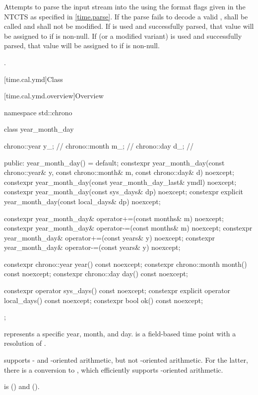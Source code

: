\begin{itemdescr}
\pnum
\effects
Attempts to parse the input stream 
into the   using
the format flags given in the NTCTS 
as specified in \ref{time.parse}.
If the parse fails to decode a valid ,
 shall be called
and  shall not be modified.
If  is used and successfully parsed,
that value will be assigned to  if  is non-null.
If  (or a modified variant) is used and successfully parsed,
that value will be assigned to  if  is non-null.

\pnum
\returns
{}.
\end{itemdescr}

[time.cal.ymd]{Class }

[time.cal.ymd.overview]{Overview}

\begin{codeblock}
namespace std::chrono {
  class year_month_day {
    chrono::year  y_;           // \expos
    chrono::month m_;           // \expos
    chrono::day   d_;           // \expos

  public:
    year_month_day() = default;
    constexpr year_month_day(const chrono::year& y, const chrono::month& m,
                             const chrono::day& d) noexcept;
    constexpr year_month_day(const year_month_day_last& ymdl) noexcept;
    constexpr year_month_day(const sys_days& dp) noexcept;
    constexpr explicit year_month_day(const local_days& dp) noexcept;

    constexpr year_month_day& operator+=(const months& m) noexcept;
    constexpr year_month_day& operator-=(const months& m) noexcept;
    constexpr year_month_day& operator+=(const years& y)  noexcept;
    constexpr year_month_day& operator-=(const years& y)  noexcept;

    constexpr chrono::year  year()  const noexcept;
    constexpr chrono::month month() const noexcept;
    constexpr chrono::day   day()   const noexcept;

    constexpr          operator sys_days()   const noexcept;
    constexpr explicit operator local_days() const noexcept;
    constexpr bool ok() const noexcept;
  };
}
\end{codeblock}

\pnum
{} represents a specific year, month, and day.
 is a field-based time point with a resolution of .
\begin{note}
 supports - and -oriented arithmetic,
but not -oriented arithmetic.
For the latter, there is a conversion to ,
which efficiently supports -oriented arithmetic.
\end{note}
 is  ()
and  ().


